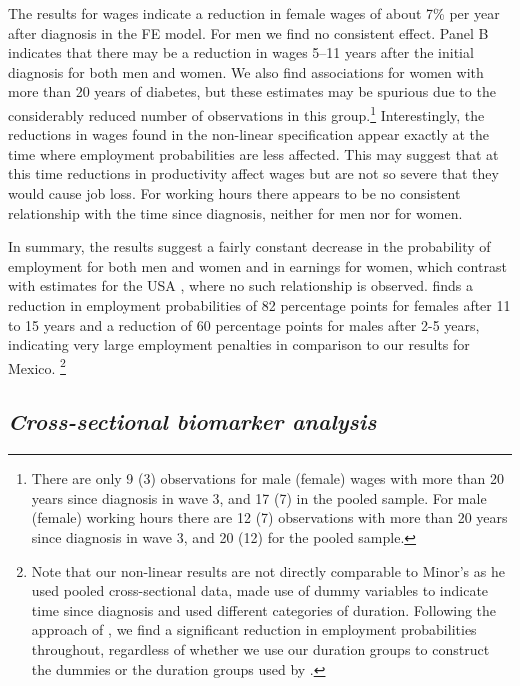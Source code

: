 \documentclass[12pt,english]{article}
\begin{document}
The results for wages indicate a reduction in female wages of about 7\% per year after diagnosis in the \ac{FE} model. For men we find no consistent effect. Panel B indicates that there may be a reduction in wages 5--11 years after the initial diagnosis for both men and women. We also find associations for women with more than 20 years of diabetes, but these estimates may be spurious due to the considerably reduced number of observations in this group.\footnote{There are only 9 (3) observations for male (female) wages with more than 20 years since diagnosis in wave 3, and 17 (7) in the pooled sample. For male (female) working hours there are 12 (7) observations with more than 20 years since diagnosis in wave 3, and 20 (12) for the pooled sample.} Interestingly, the reductions in wages found in the non-linear specification appear exactly at the time where employment probabilities are less affected. This may suggest that at this time reductions in productivity affect wages but are not so severe that they would cause job loss. For working hours there appears to be no consistent relationship with the time since diagnosis, neither for men nor for women.


In summary, the results suggest a fairly constant decrease in the probability of employment for both men and women and in earnings for women, which contrast with estimates for the USA \parencite{Minor2013}, where no such relationship is observed.  \textcite{Minor2013} finds a reduction in employment probabilities of 82 percentage points for females after 11 to 15 years and a reduction of 60 percentage points for males after 2-5 years, indicating very large employment penalties in comparison to our results for Mexico. \footnote{Note that our non-linear results are not directly comparable to Minor's as he used pooled cross-sectional data, made use of dummy variables to indicate time since diagnosis and used different categories of duration. Following the approach of \textcite{Minor2013}, we find a significant reduction in employment probabilities throughout, regardless of whether we use our duration groups to construct the dummies or the duration groups used by \textcite{Minor2013}.} 




\FloatBarrier

\subsection{\textit{Cross-sectional biomarker analysis}}
\end{document}
